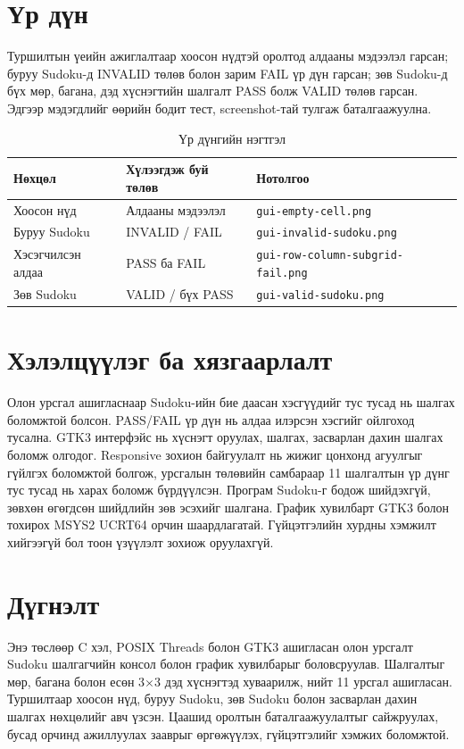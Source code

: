 \documentclass[12pt,a4paper]{report}
\begin{document}
\chapter{Үр дүн}
Туршилтын үеийн ажиглалтаар хоосон нүдтэй оролтод алдааны мэдээлэл гарсан; буруу Sudoku-д INVALID төлөв болон зарим FAIL үр дүн гарсан; зөв Sudoku-д бүх мөр, багана, дэд хүснэгтийн шалгалт PASS болж VALID төлөв гарсан. Эдгээр мэдэгдлийг өөрийн бодит тест, screenshot-тай тулгаж баталгаажуулна.
\begin{table}[H]\centering\caption{Үр дүнгийн нэгтгэл}\begin{tabular}{p{}p{}p{}}\toprule
\textbf{Нөхцөл}&\textbf{Хүлээгдэж буй төлөв}&\textbf{Нотолгоо}\\\midrule
Хоосон нүд&Алдааны мэдээлэл&\texttt{gui-empty-cell.png}\\
Буруу Sudoku&INVALID / FAIL&\texttt{gui-invalid-sudoku.png}\\
Хэсэгчилсэн алдаа&PASS ба FAIL&\texttt{gui-row-column-subgrid-fail.png}\\
Зөв Sudoku&VALID / бүх PASS&\texttt{gui-valid-sudoku.png}\\\bottomrule\end{tabular}\end{table}

\chapter{Хэлэлцүүлэг ба хязгаарлалт}
Олон урсгал ашигласнаар Sudoku-ийн бие даасан хэсгүүдийг тус тусад нь шалгах боломжтой болсон. PASS/FAIL үр дүн нь алдаа илэрсэн хэсгийг ойлгоход тусална. GTK3 интерфэйс нь хүснэгт оруулах, шалгах, засварлан дахин шалгах боломж олгодог. Responsive зохион байгуулалт нь жижиг цонхонд агуулгыг гүйлгэх боломжтой болгож, урсгалын төлөвийн самбараар 11 шалгалтын үр дүнг тус тусад нь харах боломж бүрдүүлсэн. Програм Sudoku-г бодож шийдэхгүй, зөвхөн өгөгдсөн шийдлийн зөв эсэхийг шалгана. График хувилбарт GTK3 болон тохирох MSYS2 UCRT64 орчин шаардлагатай. Гүйцэтгэлийн хурдны хэмжилт хийгээгүй бол тоон үзүүлэлт зохиож оруулахгүй.

\chapter{Дүгнэлт}
Энэ төслөөр C хэл, POSIX Threads болон GTK3 ашигласан олон урсгалт Sudoku шалгагчийн консол болон график хувилбарыг боловсруулав. Шалгалтыг мөр, багана болон есөн 3$\times$3 дэд хүснэгтэд хуваарилж, нийт 11 урсгал ашигласан. Туршилтаар хоосон нүд, буруу Sudoku, зөв Sudoku болон засварлан дахин шалгах нөхцөлийг авч үзсэн. Цаашид оролтын баталгаажуулалтыг сайжруулах, бусад орчинд ажиллуулах зааврыг өргөжүүлэх, гүйцэтгэлийг хэмжих боломжтой.
\end{document}

